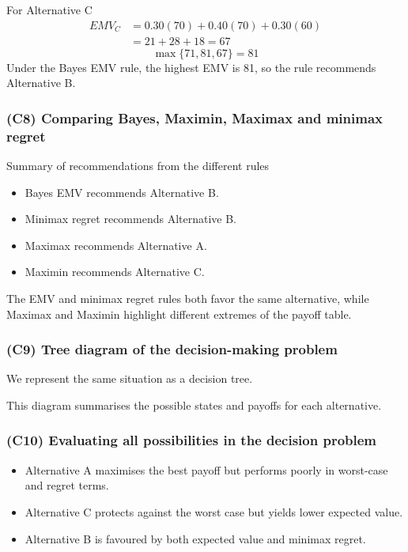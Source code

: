 For Alternative C
\[
\begin{aligned}
EMV_C &= 0.30(70) + 0.40(70) + 0.30(60) \\
&= 21 + 28 + 18 = 67
\end{aligned}
\]
\[
\max\{71, 81, 67\} = 81
\]
Under the Bayes EMV rule, the highest EMV is 81, so the rule recommends Alternative B.

\subsubsection{(C8) Comparing Bayes, Maximin, Maximax and minimax regret}\label{subsubsec:example1-1-c8}

Summary of recommendations from the different rules

\begin{itemize}
	\item Bayes EMV recommends Alternative B.
	\item Minimax regret recommends Alternative B.
	\item Maximax recommends Alternative A.
	\item Maximin recommends Alternative C.
\end{itemize}

The EMV and minimax regret rules both favor the same alternative, while Maximax and Maximin highlight different extremes of the payoff table.

\subsubsection{(C9) Tree diagram of the decision-making problem}\label{subsubsec:example1-1-c9}

We represent the same situation as a decision tree.

This diagram summarises the possible states and payoffs for each alternative.

\subsubsection{(C10) Evaluating all possibilities in the decision problem}\label{subsubsec:example1-1-c10}

\begin{itemize}
	\item Alternative A maximises the best payoff but performs poorly in worst-case and regret terms.
	\item Alternative C protects against the worst case but yields lower expected value.
	\item Alternative B is favoured by both expected value and minimax regret.
\end{itemize}

